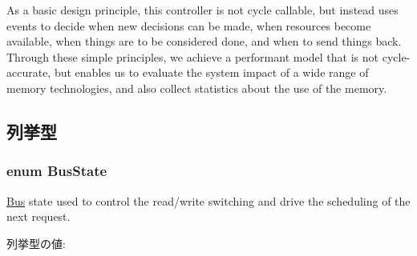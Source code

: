 As a basic design principle, this controller is not cycle callable, but instead uses events to decide when new decisions can be made, when resources become available, when things are to be considered done, and when to send things back. Through these simple principles, we achieve a performant model that is not cycle-\/accurate, but enables us to evaluate the system impact of a wide range of memory technologies, and also collect statistics about the use of the memory. 

\subsection{列挙型}
\hypertarget{classDRAMCtrl_a167375ed712267f43fee8fa5d1aa4f11}{
\subsubsection[{BusState}]{\setlength{\rightskip}{0pt plus 5cm}enum {\bf BusState}}}
\label{classDRAMCtrl_a167375ed712267f43fee8fa5d1aa4f11}
\hyperlink{namespaceBus}{Bus} state used to control the read/write switching and drive the scheduling of the next request. \begin{Desc}
\item[列挙型の値: ]\par
\begin{description}
\item[{\em 
\hypertarget{classDRAMCtrl_a167375ed712267f43fee8fa5d1aa4f11acb9be765f361bb7efb9073730aac92c6}{
READ}
\label{classDRAMCtrl_a167375ed712267f43fee8fa5d1aa4f11acb9be765f361bb7efb9073730aac92c6}
}]\item[{\em 
\hypertarget{classDRAMCtrl_a167375ed712267f43fee8fa5d1aa4f11a12f0259011cf4a6cf10274abcf71daaa}{
READ\_\-TO\_\-WRITE}
\label{classDRAMCtrl_a167375ed712267f43fee8fa5d1aa4f11a12f0259011cf4a6cf10274abcf71daaa}
}]\item[{\em 
\hypertarget{classDRAMCtrl_a167375ed712267f43fee8fa5d1aa4f11a61aa7ff70b76bff0fda378cf61d6afbc}{
WRITE}
\label{classDRAMCtrl_a167375ed712267f43fee8fa5d1aa4f11a61aa7ff70b76bff0fda378cf61d6afbc}
}]\item[{\em 
\hypertarget{classDRAMCtrl_a167375ed712267f43fee8fa5d1aa4f11ad12c9fdf4a8009963c2eb263513e4aab}{
WRITE\_\-TO\_\-READ}
\label{classDRAMCtrl_a167375ed712267f43fee8fa5d1aa4f11ad12c9fdf4a8009963c2eb263513e4aab}
}]\end{description}
\end{Desc}




